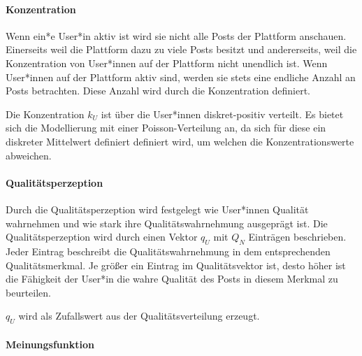 
\paragraph{Konzentration}

Wenn ein*e User*in aktiv ist wird sie nicht alle Posts der Plattform anschauen. Einerseits weil die Plattform dazu zu viele Posts besitzt und andererseits, weil die Konzentration von User*innen auf der Plattform nicht unendlich ist. Wenn User*innen auf der Plattform aktiv sind, werden sie stets eine endliche Anzahl an Posts betrachten. Diese Anzahl wird durch die Konzentration definiert.

Die Konzentration $k_U$ ist über die User*innen diskret-positiv verteilt. Es bietet sich die Modellierung mit einer Poisson-Verteilung an, da sich für diese ein diskreter Mittelwert definiert definiert wird, um welchen die Konzentrationswerte abweichen.

\paragraph{Qualitätsperzeption}
\label{uqualitaet}

Durch die Qualitätsperzeption wird festgelegt wie User*innen Qualität wahrnehmen und wie stark ihre Qualitätswahrnehmung ausgeprägt ist. Die Qualitätsperzeption wird durch einen Vektor $q_U$ mit $Q_N$  Einträgen beschrieben. Jeder Eintrag beschreibt die Qualitätswahrnehmung in dem entsprechenden Qualitätsmerkmal. Je größer ein Eintrag im Qualitätsvektor ist, desto höher ist die Fähigkeit der User*in die wahre Qualität des Posts in diesem Merkmal zu beurteilen.

$q_U$ wird als Zufallswert aus der Qualitätsverteilung erzeugt.

\paragraph{Meinungsfunktion}

